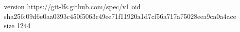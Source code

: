 version https://git-lfs.github.com/spec/v1
oid sha256:09d6e0aa0393c450f5063c49ee71f11920a1d7cf56a717a75028eea9ca0a4ace
size 1244
